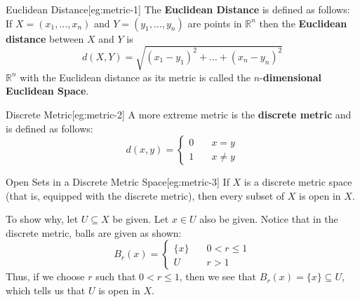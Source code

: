 \begin{egBox}{Euclidean Distance}[eg:metric-1]
    The \textbf{Euclidean Distance} is defined as follows: 
    If \( X = ( x_{ 1 }, \ldots, x_{ n } ) \) and 
    \( Y = ( y_{ 1 }, \ldots, y_{ n } ) \) are points in \( \mathbb{R}^{ n } \)
    then the \textbf{Euclidean distance} between \( X \) and \( Y \) is 
    \begin{equation*}
        d( X, Y )
        =
        \sqrt{ 
            ( x_{ 1 } - y_{ 1 } )^{ 2 } 
            + \ldots + 
            ( x_{ n } - y_{ n } )^{ 2 }
        }
    \end{equation*}
    \( \mathbb{R}^{ n } \) with the Euclidean distance as its metric is called 
    the \( n \)-\textbf{dimensional Euclidean Space}.
\end{egBox}

\begin{egBox}{Discrete Metric}[eg:metric-2]
    A more extreme metric is the \textbf{discrete metric} and is defined as 
    follows: 
    \begin{equation*}
        d( x, y )
        =
        \begin{cases} 
            0 \quad &x = y
            \\ 
            1 \quad &x \neq y
        \end{cases}
    \end{equation*}
\end{egBox}

\begin{egBox}{Open Sets in a Discrete Metric Space}[eg:metric-3]
    If \( X \) is a discrete metric space (that is, equipped with the 
    discrete metric), then every subset of \( X \) is open in \( X \).

    \baseSkip

    To show why, let \( U \subseteq X \) be given. Let \( x \in U \) also be 
    given. Notice that in the discrete metric, balls are given as shown: 
    \begin{equation*}
        B_{ r }( x )
        =
        \begin{cases} 
            \{ x \} \quad & 0 < r \leq 1
            \\
            U \quad & r > 1
        \end{cases}
    \end{equation*}
    Thus, if we choose \( r \) such that \( 0 < r \leq 1 \), then we see that 
    \( B_{ r }( x ) = \{ x \} \subseteq U \), which tells us that \( U \) is 
    open in \( X \).
\end{egBox}


